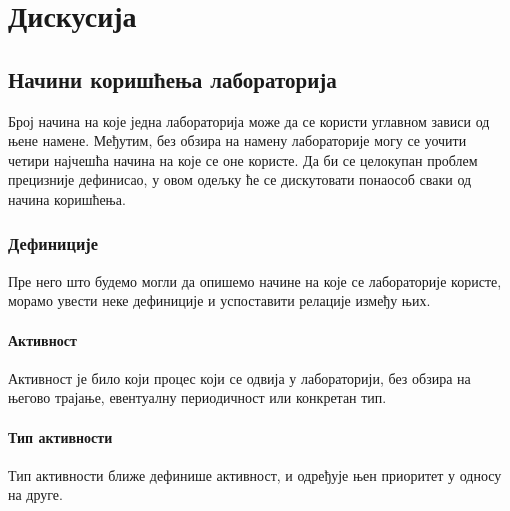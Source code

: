 \documentclass[a4paper, 12pt, diplomski]{etfcyr}
\renewenvironment{justify}{%
	\trivlist
	\justifying
	\itemindent\JustifyingParindent
	\item\relax
}{%
\endtrivlist
}
\begin{document}
	\chapter{Дискусија}
		
		\section{Начини коришћења лабораторија}
		
		\begin{justify}
			Број начина на које једна лабораторија може да се користи углавном зависи од њене намене. Међутим, без обзира на намену лабораторије могу се уочити четири најчешћа начина на које се оне користе. Да би се целокупан проблем прецизније дефинисао, у овом одељку ће се дискутовати понаособ сваки од начина коришћења.
		\end{justify}
		
		\subsection{Дефиниције}
		
		\begin{justify}
			Пре него што будемо могли да опишемо начине на које се лабораторије користе, морамо увести неке дефиниције и успоставити релације између њих.
		\end{justify}
		
		\subsubsection{Активност}
		
		\begin{justify}
			Активност је било који процес који се одвија у лабораторији, без обзира на његово трајање, евентуалну периодичност или конкретан тип.
		\end{justify}

		\subsubsection{Тип активности}

		\begin{justify}
			Тип активности ближе дефинише активност, и одређује њен приоритет у односу на друге.
		\end{justify}
		
\end{document}
